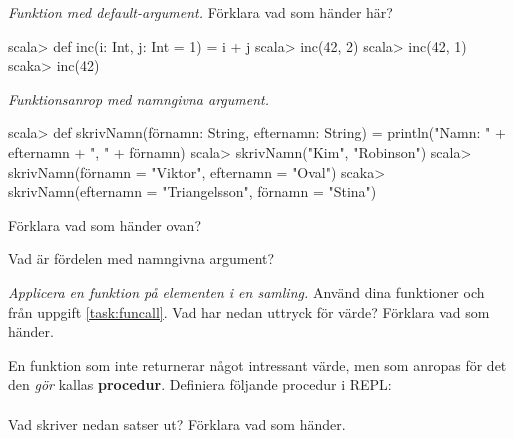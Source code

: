 \Subtask {}

\Subtask {}

\Subtask {}

\Subtask {}

\Task \emph{Funktion med default-argument.} Förklara vad som händer här?
\begin{REPL}
scala> def inc(i: Int, j: Int = 1) = i + j
scala> inc(42, 2)
scala> inc(42, 1)
scaka> inc(42)
\end{REPL}

\Task \emph{Funktionsanrop med namngivna argument.} 
\begin{REPL}
scala> def skrivNamn(förnamn: String, efternamn: String) = 
         println("Namn: " + efternamn + ", " + förnamn)
scala> skrivNamn("Kim", "Robinson")
scala> skrivNamn(förnamn = "Viktor", efternamn = "Oval")
scaka> skrivNamn(efternamn = "Triangelsson", förnamn = "Stina")
\end{REPL}

\Subtask Förklara vad som händer ovan?

\Subtask\Pen Vad är fördelen med namngivna argument?



\Task \emph{Applicera en funktion på elementen i en samling.} Använd dina funktioner  och  från uppgift \ref{task:funcall}. Vad har nedan uttryck för värde? Förklara vad som händer.

\Subtask {}

\Subtask {}

\Subtask {}

\Subtask {}

\Subtask {}

\Subtask {}

\Subtask {}

\Subtask {}



\Task En funktion som inte returnerar något intressant värde, men som anropas för det den \emph{gör} kallas \textbf{procedur}. Definiera följande procedur i REPL: \\ 
 \\
Vad skriver nedan satser ut? Förklara vad som händer.


